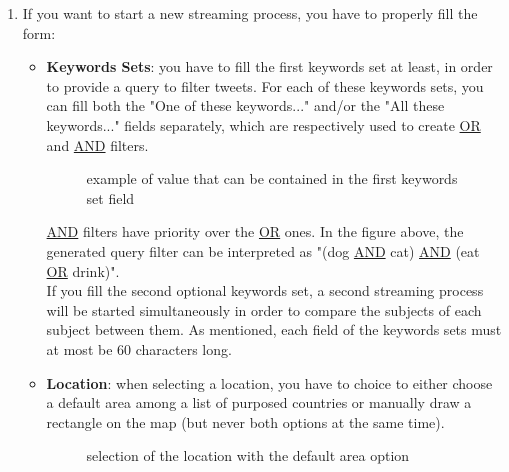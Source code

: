 \documentclass[a4paper,11pt]{report}
\begin{document}
\begin{enumerate}
	\item If you want to start a new streaming process, you have to properly fill the form:
	\begin{itemize}
		\item \textbf{Keywords Sets}: you have to fill the first keywords set at least, in order to provide a query to filter tweets. For each of these keywords sets, you can fill both the "One of these keywords..." and/or the "All these keywords..." fields separately, which are respectively used to create \underline{OR} and \underline{AND} filters.
		\begin{figure}[H]
		\vspace{-5pt}
		\begin{center}
		\vspace{-5pt}
		\caption{example of value that can be contained in the first keywords set field}
		\end{center}
		\end{figure}
		\vspace{-10pt}
		\underline{AND} filters have priority over the \underline{OR} ones. In the figure above, the generated query filter can be interpreted as "(dog \underline{AND} cat) \underline{AND} (eat \underline{OR} drink)".\\
		
		If you fill the second optional keywords set, a second streaming process will be started simultaneously in order to compare the subjects of each subject between them. As mentioned, each field of the keywords sets must at most be 60 characters long.
		
		\item \textbf{Location}: when selecting a location, you have to choice to either choose a default area among a list of purposed countries or manually draw a rectangle on the map (but never both options at the same time).
		\begin{figure}[H]
		\vspace{-5pt}
		\begin{center}
		\vspace{-5pt}
		\caption{selection of the location with the default area option}
		\end{center}
		\end{figure}
		\vspace{-10pt}
		

\end{itemize}
\end{enumerate}
\end{document}
